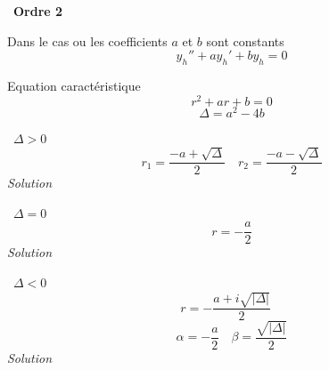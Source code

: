\documentclass{article}
\begin{document}
\hrulefill \,
\textbf{Ordre 2}
\hrulefill 
\begin{center}
    Dans le cas ou les coefficients $a$ et $b$ sont constants
    \begin{equation*}
        y_h'' + ay_h' + by_h = 0
    \end{equation*}

    Equation caractéristique
    \begin{equation*}
        r^2 + ar + b = 0
    \end{equation*}
    \begin{equation*}
        \Delta = a^2 - 4b
    \end{equation*}

    \hrulefill \,
    \textbf{$\Delta > 0$}
    \hrulefill
    \begin{equation*}
        r_1 = \frac{-a + \sqrt{\Delta}}{2} \quad r_2 = \frac{-a - \sqrt{\Delta}}{2}
    \end{equation*}
    \textit{Solution } \\ \vspace{1mm}

    \vspace{4mm}

    \hrulefill \,
    \textbf{$\Delta = 0$}
    \hrulefill
    \begin{equation*}
        r = -\frac{a}{2}
    \end{equation*}
    \textit{Solution } \\ \vspace{1mm}

    \vspace{4mm}

    \hrulefill \,
    \textbf{$\Delta < 0$}
    \hrulefill
    \begin{equation*}
        r = -\frac{a + i\sqrt{|\Delta|}}{2} \quad 
    \end{equation*}
    \begin{equation*}
        \alpha = -\frac{a}{2} \quad \beta = \frac{\sqrt{|\Delta|}}{2}
    \end{equation*}
    \textit{Solution } \\ \vspace{1mm}

    
\end{center}
\end{document}

